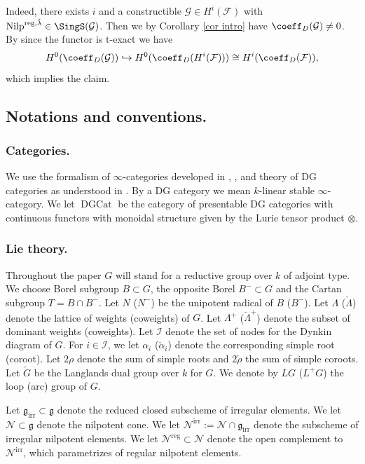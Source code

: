 \documentclass[9pt]{amsart}
\DeclareMathOperator{\reg}{{reg}}
\newcommand{\cF}{{\mathcal F}}
\newcommand{\cG}{{\mathcal G}}
\newcommand{\cI}{{\mathcal I}}
\newcommand{\cN}{{\mathcal N}}
\DeclareMathOperator{\DGCat}{{DGCat}}
\DeclareMathOperator{\irr}{{irr}} \DeclareMathOperator{\Eis}{{Eis}}
\DeclareMathOperator{\Nilp}{{Nilp}} \DeclareMathOperator{\op}{{op}}
\numberwithin{equation}{section}
\begin{document}
Indeed, there exists $i$ and a constructible $\cG \in H^i(\cF)$ with $\Nilp^{\reg, \check{\lambda}}  \in \SingS(\cG)$. Then we by Corollary \ref{cor intro} have $\coeff_D(\cG) \neq 0$. By since the functor is t-exact we have 
$$H^0(\coeff_D(\cG)) \hookrightarrow H^0(\coeff_D(H^i(\cF))) \cong H^i(\coeff_D(\cF)),$$
which implies the claim.


	\subsection{Notations and conventions.}
	
		\subsubsection{Categories.} We use the formalism of $\infty$-categories developed in \cite{LHTT}, \cite{HA}, and theory of DG categories as understood in \cite{GR}. By a DG category we mean $k$-linear stable $\infty$-category. We let $\DGCat$ be the category
	of presentable DG categories with continuous functors with monoidal structure given by the Lurie tensor product $\otimes$. 
	
	\subsubsection{Lie theory.}
	
	Throughout the paper $G$ will stand for a reductive group over $k$ of adjoint type. We choose Borel subgroup $B \subset G$, the opposite Borel $B^- \subset G$ and the Cartan subgroup $T= B \cap B^-$. Let $N$ ($N^-$) be the unipotent radical of $B$ ($B^-$). Let $\Lambda$ ($\check{\Lambda}$) denote the lattice of weights (coweights) of $G$. Let $\Lambda^+$ ($\check{\Lambda}^+$) denote the subset of dominant weights (coweights). Let $\cI$ denote the set of nodes for the Dynkin diagram of $G$. For $i \in \cI$, we let $\alpha_i$ ($\check{\alpha}_i$) denote the
corresponding simple root (coroot). Let $2\rho$ denote the sum of simple roots and $2\check{\rho}$ the sum of simple coroots. Let $\check{G}$ be the Langlands dual group over $k$ for $G$. We denote by $LG$ ($L^+G$) the loop (arc) group of $G$.

Let $\mathfrak{g}_{\irr} \subset \mathfrak{g}$ denote the reduced closed subscheme of irregular elements.
We let $\cN \subset \mathfrak{g}$ denote the nilpotent cone. We let $\cN^{\irr} := \cN \cap \mathfrak{g}_{\irr}$ denote the subscheme of irregular
nilpotent elements. We let $\cN^{\reg} \subset \cN$ denote the open complement to $\cN^{\irr}$, which parametrizes
of regular nilpotent elements.
	
\end{document}
